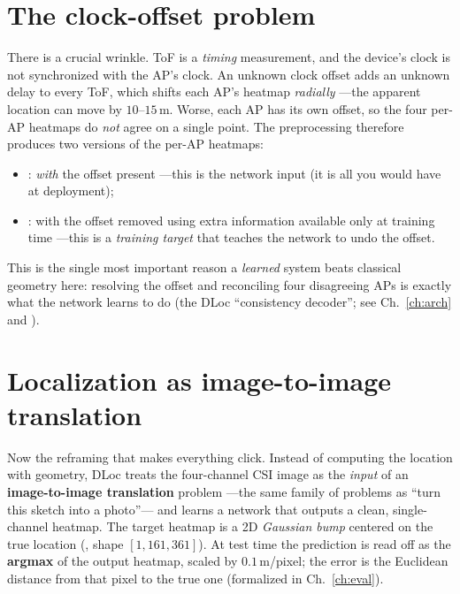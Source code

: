 \section{The clock-offset problem}
\label{sec:found:offset}

There is a crucial wrinkle. ToF is a \emph{timing} measurement, and the device's clock is not
synchronized with the AP's clock. An unknown clock offset adds an unknown delay to every ToF, which
shifts each AP's heatmap \emph{radially} ---the apparent location can move by $10$--$15$\,m. Worse,
each AP has its own offset, so the four per-AP heatmaps do \emph{not} agree on a single point. The
preprocessing therefore produces two versions of the per-AP heatmaps:
\begin{itemize}[leftmargin=1.4em,nosep]
  \item {}: \emph{with} the offset present ---this is the network input
  (it is all you would have at deployment);
  \item {}: with the offset removed using extra information available only at
  training time ---this is a \emph{training target} that teaches the network to undo the offset.
\end{itemize}
This is the single most important reason a \emph{learned} system beats classical geometry here:
resolving the offset and reconciling four disagreeing APs is exactly what the network learns to do
(the DLoc ``consistency decoder''; see Ch.~\ref{ch:arch} and ).

\section{Localization as image-to-image translation}
\label{sec:found:translation}

Now the reframing that makes everything click. Instead of computing the location with geometry, DLoc
treats the four-channel CSI image as the \emph{input} of an \textbf{image-to-image translation}
problem ---the same family of problems as ``turn this sketch into a photo''--- and learns a network
that outputs a clean, single-channel heatmap. The target heatmap is a 2D \emph{Gaussian bump}
centered on the true location (, shape $[1,161,361]$). At test time the
prediction is read off as the \textbf{argmax} of the output heatmap, scaled by $0.1$\,m/pixel; the
error is the Euclidean distance from that pixel to the true one (formalized in Ch.~\ref{ch:eval}).

